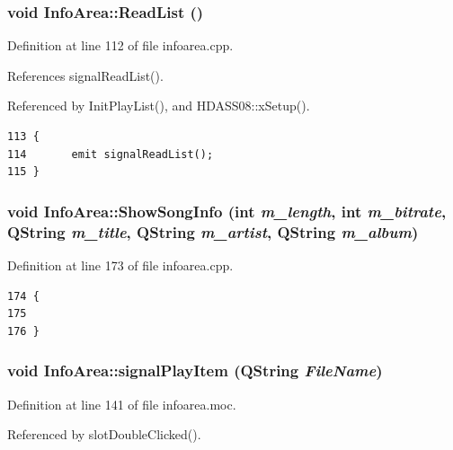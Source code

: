 \subsubsection{\setlength{\rightskip}{0pt plus 5cm}void Info\-Area::Read\-List ()\hspace{0.3cm}{\tt  [slot]}}\label{classInfoArea_InfoAreai1}




Definition at line 112 of file infoarea.cpp.

References signal\-Read\-List().

Referenced by Init\-Play\-List(), and HDASS08::x\-Setup().



\footnotesize\begin{verbatim}113 {
114       emit signalReadList();
115 }
\end{verbatim}\normalsize 
{}
\subsubsection{\setlength{\rightskip}{0pt plus 5cm}void Info\-Area::Show\-Song\-Info (int {\em m\_\-length}, int {\em m\_\-bitrate}, QString {\em m\_\-title}, QString {\em m\_\-artist}, QString {\em m\_\-album})\hspace{0.3cm}{\tt  [private]}}\label{classInfoArea_InfoAread2}




Definition at line 173 of file infoarea.cpp.



\footnotesize\begin{verbatim}174 {
175 
176 }
\end{verbatim}\normalsize 
{}
\subsubsection{\setlength{\rightskip}{0pt plus 5cm}void Info\-Area::signal\-Play\-Item (QString {\em File\-Name})\hspace{0.3cm}{\tt  [signal]}}\label{classInfoArea_InfoAreal2}




Definition at line 141 of file infoarea.moc.

Referenced by slot\-Double\-Clicked().




